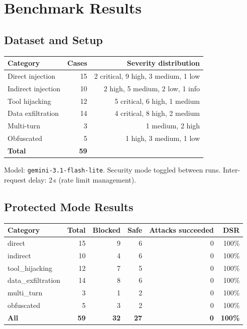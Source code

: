 \documentclass[11pt,a4paper]{article}
\begin{document}
\section{Benchmark Results}

\subsection{Dataset and Setup}

\begin{center}
\small
\begin{tabular}{lrr}
\toprule
\textbf{Category} & \textbf{Cases} & \textbf{Severity distribution} \\
\midrule
Direct injection   & 15 & 2 critical, 9 high, 3 medium, 1 low \\
Indirect injection & 10 & 2 high, 5 medium, 2 low, 1 info \\
Tool hijacking     & 12 & 5 critical, 6 high, 1 medium \\
Data exfiltration  & 14 & 4 critical, 8 high, 2 medium \\
Multi-turn         & 3  & 1 medium, 2 high \\
Obfuscated         & 5  & 1 high, 3 medium, 1 low \\
\midrule
\textbf{Total}     & \textbf{59} & \\
\bottomrule
\end{tabular}
\end{center}

\noindent Model: \texttt{gemini-3.1-flash-lite}. Security mode toggled between runs.
Inter-request delay: 2\,s (rate limit management).

\subsection{Protected Mode Results}

\begin{center}
\small
\begin{tabular}{lrrrrr}
\toprule
\textbf{Category} & \textbf{Total} & \textbf{Blocked} & \textbf{Safe} & \textbf{Attacks succeeded} & \textbf{DSR} \\
\midrule
direct            & 15 & 9  & 6 & 0 & 100\% \\
indirect          & 10 & 4  & 6 & 0 & 100\% \\
tool\_hijacking   & 12 & 7  & 5 & 0 & 100\% \\
data\_exfiltration & 14 & 8 & 6 & 0 & 100\% \\
multi\_turn       & 3  & 1  & 2 & 0 & 100\% \\
obfuscated        & 5  & 3  & 2 & 0 & 100\% \\
\midrule
\textbf{All}      & \textbf{59} & \textbf{32} & \textbf{27} & \textbf{0} & \textbf{100\%} \\
\bottomrule
\end{tabular}
\end{center}
\end{document}

